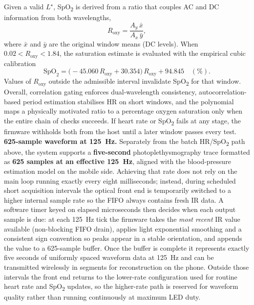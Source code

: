 \noindent Given a valid $L^\star$, SpO\textsubscript{2} is derived from a ratio that couples AC and
DC information from both wavelengths,
\begin{equation}
  R_{\mathrm{oxy}} = \frac{A_y\,\bar{x}}{A_x\,\bar{y}},
\end{equation}
where $\bar{x}$ and $\bar{y}$ are the original window means (DC levels). When
$0.02 < R_{\mathrm{oxy}} < 1.84$, the saturation estimate is evaluated with the empirical cubic
calibration
\begin{equation}
  \mathrm{SpO}_2 =
  \bigl(-45.060\, R_{\mathrm{oxy}} + 30.354\bigr)\, R_{\mathrm{oxy}} + 94.845
  \quad (\%).
\end{equation}
Values of $R_{\mathrm{oxy}}$ outside the admissible interval invalidate SpO\textsubscript{2} for
that window. Overall, correlation gating enforces dual-wavelength consistency, autocorrelation-based
period estimation stabilises HR on short windows, and the polynomial maps a physically motivated
ratio to a percentage oxygen saturation only when the entire chain of checks succeeds. If heart rate
or SpO\textsubscript{2} fails at any stage, the firmware withholds both from the host until a later
window passes every test. \\

\noindent \textbf{625-sample waveform at 125~Hz.} Separately from the batch HR/SpO\textsubscript{2}
path above, the system supports a \textbf{five-second} photoplethysmography trace formatted as \textbf{625 samples at
an effective 125~Hz}, aligned with the blood-pressure estimation model on the mobile side. Achieving
that rate does not rely on the main loop running exactly every eight milliseconds; instead, during
scheduled short acquisition intervals the optical front end is temporarily switched to a higher
internal sample rate so the FIFO always contains fresh IR data. A software timer keyed on elapsed
microseconds then decides when each output sample is due: at each 125~Hz tick the firmware takes the
\emph{most recent} IR value available (non-blocking FIFO drain), applies light exponential smoothing
and a consistent sign convention so peaks appear in a stable orientation, and appends the value to a
625-sample buffer. Once the buffer is complete it represents exactly five seconds of uniformly spaced
waveform data at 125~Hz and can be transmitted wirelessly in segments for reconstruction on the phone.
Outside those intervals the front end returns to the lower-rate configuration used for routine heart
rate and SpO\textsubscript{2} updates, so the higher-rate path is reserved for waveform quality rather
than running continuously at maximum LED duty. \\

